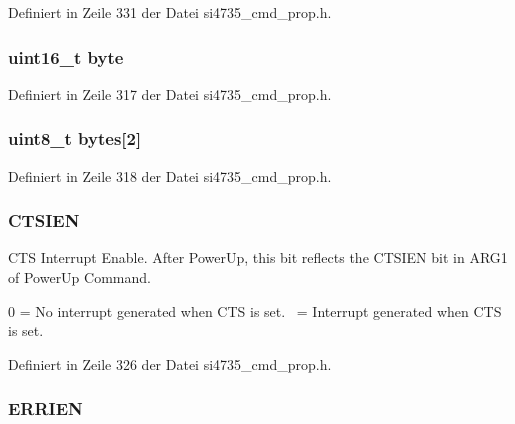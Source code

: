 Definiert in Zeile 331 der Datei si4735\+\_\+cmd\+\_\+prop.\+h.

\hypertarget{uniongpo__ien_ab0549c1b5ea980a02e7eab77e21fea49}{}
\subsubsection[{byte}]{\setlength{\rightskip}{0pt plus 5cm}uint16\+\_\+t byte}\label{uniongpo__ien_ab0549c1b5ea980a02e7eab77e21fea49}


Definiert in Zeile 317 der Datei si4735\+\_\+cmd\+\_\+prop.\+h.

\hypertarget{uniongpo__ien_a46e4c05d20a047ec169f60d3167e912e}{}
\subsubsection[{bytes}]{\setlength{\rightskip}{0pt plus 5cm}uint8\+\_\+t bytes\mbox{[}2\mbox{]}}\label{uniongpo__ien_a46e4c05d20a047ec169f60d3167e912e}


Definiert in Zeile 318 der Datei si4735\+\_\+cmd\+\_\+prop.\+h.

\hypertarget{uniongpo__ien_a7790e2a270c4400498be7ba34cfaac5e}{}
\subsubsection[{C\+T\+S\+I\+E\+N}]{\setlength{\rightskip}{0pt plus 5cm}C\+T\+S\+I\+E\+N}\label{uniongpo__ien_a7790e2a270c4400498be7ba34cfaac5e}


C\+T\+S Interrupt Enable. After Power\+Up, this bit reflects the C\+T\+S\+I\+E\+N bit in A\+R\+G1 of Power\+Up Command. 

0 = No interrupt generated when C\+T\+S is set.~ = Interrupt generated when C\+T\+S is set. 

Definiert in Zeile 326 der Datei si4735\+\_\+cmd\+\_\+prop.\+h.

\hypertarget{uniongpo__ien_a0523a5e19216a16b04bb981453c60664}{}
\subsubsection[{E\+R\+R\+I\+E\+N}]{\setlength{\rightskip}{0pt plus 5cm}E\+R\+R\+I\+E\+N}\label{uniongpo__ien_a0523a5e19216a16b04bb981453c60664}


